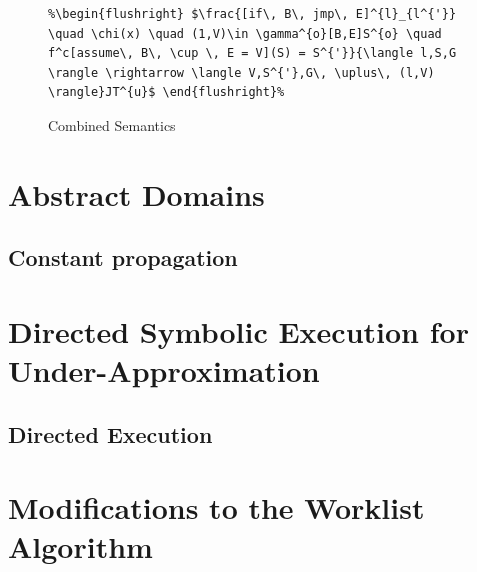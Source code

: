 \documentclass{kththesis}
\begin{document}
\begin{figure}[h]
    \centering


\begin{lstlisting}[escapechar=\%]
%\begin{flushright} $\frac{[if\, B\, jmp\, E]^{l}_{l^{'}} \quad \chi(x) \quad (1,V)\in \gamma^{o}[B,E]S^{o} \quad f^c[assume\, B\, \cup \, E = V](S) = S^{'}}{\langle l,S,G \rangle \rightarrow \langle V,S^{'},G\, \uplus\, (l,V) \rangle}JT^{o}$ \end{flushright}%
%\begin{flushright} $\frac{[if\, B\, jmp\, E]^{l}_{l^{'}} \quad \chi(x) \quad (1,V)\in \gamma^{o}[B,E]S^{o} \quad f^c[assume\, B\, \cup \, E = V](S) = S^{'}}{\langle l,S,G \rangle \rightarrow \langle V,S^{'},G\, \uplus\, (l,V) \rangle}JT^{u}$ \end{flushright}%
\end{lstlisting}



\caption{Combined Semantics}
    \label{fig:overApproximationSemantics}
\end{figure}



 

\section{Abstract Domains}

\subsection{Constant propagation}


\section{Directed Symbolic Execution for Under-Approximation}
\subsection{Directed Execution}


\section{Modifications to the Worklist Algorithm}
\end{document}
